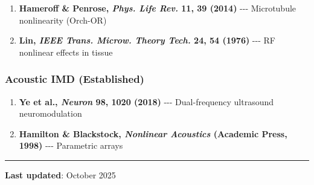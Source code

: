 \begin{enumerate}
\def\labelenumi{\arabic{enumi}.}
\setcounter{enumi}{2}
\tightlist
\item
  \textbf{Hameroff \& Penrose, \emph{Phys. Life Rev.} 11, 39 (2014)}
  -\/-\/- Microtubule nonlinearity (Orch-OR)
\item
  \textbf{Lin, \emph{IEEE Trans. Microw. Theory Tech.} 24, 54 (1976)}
  -\/-\/- RF nonlinear effects in tissue
\end{enumerate}

\subsubsection{Acoustic IMD
(Established)}\label{acoustic-imd-established}

\begin{enumerate}
\def\labelenumi{\arabic{enumi}.}
\setcounter{enumi}{4}
\tightlist
\item
  \textbf{Ye et al., \emph{Neuron} 98, 1020 (2018)} -\/-\/-
  Dual-frequency ultrasound neuromodulation
\item
  \textbf{Hamilton \& Blackstock, \emph{Nonlinear Acoustics} (Academic
  Press, 1998)} -\/-\/- Parametric arrays
\end{enumerate}

\begin{center}\rule{0.5\linewidth}{0.5pt}\end{center}

\textbf{Last updated}: October 2025

